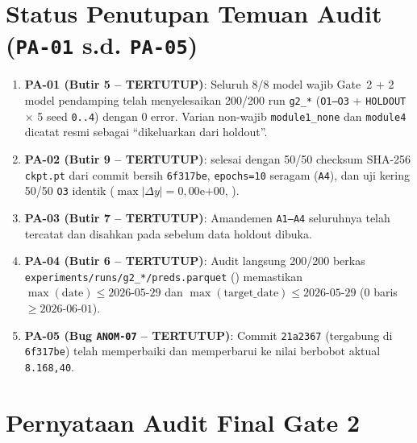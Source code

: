 \documentclass[11pt,a4paper]{article}
\begin{document}
\section{Status Penutupan Temuan Audit (\texttt{PA-01} s.d. \texttt{PA-05})}
\begin{enumerate}
  \item \textbf{PA-01 (Butir 5 -- TERTUTUP)}: Seluruh 8/8 model wajib Gate~2 + 2 model pendamping telah menyelesaikan 200/200 run \texttt{g2\_*} (\texttt{O1--O3} + \texttt{HOLDOUT} $\times$ 5 seed \texttt{0..4}) dengan 0 error. Varian non-wajib \texttt{module1\_none} dan \texttt{module4} dicatat resmi sebagai ``dikeluarkan dari holdout''.
  \item \textbf{PA-02 (Butir 9 -- TERTUTUP)}:  selesai dengan 50/50 checksum SHA-256 \texttt{ckpt.pt} dari commit bersih \texttt{6f317be}, \texttt{epochs=10} seragam (\texttt{A4}), dan uji kering  50/50 \texttt{O3} identik ($\max|\Delta y|=0{,}00\text{e+00}$, ).
  \item \textbf{PA-03 (Butir 7 -- TERTUTUP)}: Amandemen \texttt{A1--A4} seluruhnya telah tercatat dan disahkan pada  sebelum data holdout dibuka.
  \item \textbf{PA-04 (Butir 6 -- TERTUTUP)}: Audit langsung 200/200 berkas \texttt{experiments/runs/g2\_*/preds.parquet} () memastikan $\max(\text{date})\le 2026\text{-}05\text{-}29$ dan $\max(\text{target\_date})\le 2026\text{-}05\text{-}29$ (0 baris $\ge 2026\text{-}06\text{-}01$).
  \item \textbf{PA-05 (Bug \texttt{ANOM-07} -- TERTUTUP)}: Commit \texttt{21a2367} (tergabung di \texttt{6f317be}) telah memperbaiki  dan memperbarui  ke nilai berbobot aktual \texttt{8.168,40}.
\end{enumerate}

\section{Pernyataan Audit Final Gate 2}
\end{document}
